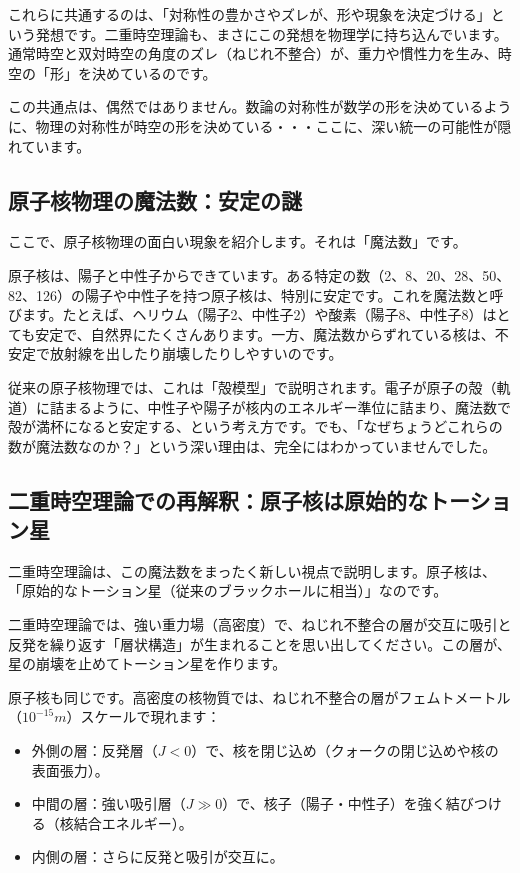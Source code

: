 \documentclass[dvipdfmx,12pt,a4paper]{jsarticle}
\begin{document}
これらに共通するのは、「対称性の豊かさやズレが、形や現象を決定づける」という発想です。二重時空理論も、まさにこの発想を物理学に持ち込んでいます。通常時空と双対時空の角度のズレ（ねじれ不整合）が、重力や慣性力を生み、時空の「形」を決めているのです。

この共通点は、偶然ではありません。数論の対称性が数学の形を決めているように、物理の対称性が時空の形を決めている・・・ここに、深い統一の可能性が隠れています。

\subsection{原子核物理の魔法数：安定の謎}

ここで、原子核物理の面白い現象を紹介します。それは「魔法数」です。

原子核は、陽子と中性子からできています。ある特定の数（2、8、20、28、50、82、126）の陽子や中性子を持つ原子核は、特別に安定です。これを魔法数と呼びます。たとえば、ヘリウム（陽子2、中性子2）や酸素（陽子8、中性子8）はとても安定で、自然界にたくさんあります。一方、魔法数からずれている核は、不安定で放射線を出したり崩壊したりしやすいのです。

従来の原子核物理では、これは「殻模型」で説明されます。電子が原子の殻（軌道）に詰まるように、中性子や陽子が核内のエネルギー準位に詰まり、魔法数で殻が満杯になると安定する、という考え方です。でも、「なぜちょうどこれらの数が魔法数なのか？」という深い理由は、完全にはわかっていませんでした。

\subsection{二重時空理論での再解釈：原子核は原始的なトーション星}

二重時空理論は、この魔法数をまったく新しい視点で説明します。原子核は、「原始的なトーション星（従来のブラックホールに相当）」なのです。

二重時空理論では、強い重力場（高密度）で、ねじれ不整合の層が交互に吸引と反発を繰り返す「層状構造」が生まれることを思い出してください。この層が、星の崩壊を止めてトーション星を作ります。

原子核も同じです。高密度の核物質では、ねじれ不整合の層がフェムトメートル（$10^{-15} m$）スケールで現れます：
\begin{itemize}
  \item 外側の層：反発層（$J < 0$）で、核を閉じ込め（クォークの閉じ込めや核の表面張力）。
  \item 中間の層：強い吸引層（$J \gg 0$）で、核子（陽子・中性子）を強く結びつける（核結合エネルギー）。
  \item 内側の層：さらに反発と吸引が交互に。
\end{itemize}
\end{document}
